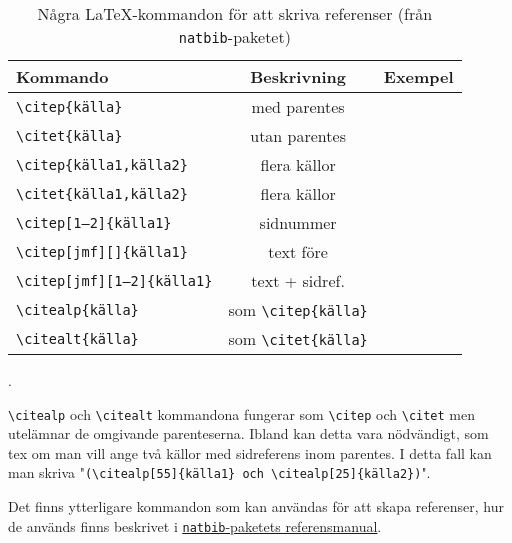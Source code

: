 \begin{table}[ht]
  \centering
  \renewcommand{\arraystretch}{1.25}%
  \begin{tabular}[t]{lcc}
    \toprule
    {\sffamily\textbf{Kommando}} &
    {\sffamily\textbf{Beskrivning}} &
    {\sffamily\textbf{Exempel}} \\
    \midrule
    \texttt{\textbackslash{}citep\{källa\}} &
    med parentes &
    \citep{bergman+wallin-2001} \\
    \texttt{\textbackslash{}citet\{källa\}} &
    utan parentes &
    \citet{bergman+wallin-2001} \\
    \midrule
    \texttt{\textbackslash{}citep\{källa1,källa2\}} &
    flera källor &
    \citep{bergman+wallin-2001,bergman-1977} \\
    \texttt{\textbackslash{}citet\{källa1,källa2\}} &
    flera källor &
    \citet{bergman+wallin-2001,bergman-1977} \\
    \midrule
    \texttt{\textbackslash{}citep[1--2]\{källa1\}} &
    sidnummer &
    \citep[1--2]{bergman-1977} \\
    \texttt{\textbackslash{}citep[jmf][]\{källa1\}} &
    text före &
    \citep[jmf][]{bergman-1977} \\
    \texttt{\textbackslash{}citep[jmf][1--2]\{källa1\}} &
    text + sidref. &
    \citep[jmf][1--2]{bergman-1977} \\
    \midrule
    \texttt{\textbackslash{}citealp\{källa\}} &
    som \texttt{\textbackslash{}citep\{källa\}} &
    \citealp{bergman+wallin-2001} \\
    \texttt{\textbackslash{}citealt\{källa\}} &
    som \texttt{\textbackslash{}citet\{källa\}} &
    \citealt{bergman+wallin-2001} \\
    \bottomrule
  \end{tabular}
  \caption{Några \LaTeX{}-kommandon för att skriva referenser (från
    \texttt{natbib}-paketet)}.
  \label{tab-cite-kommandon}
\end{table}

\texttt{\textbackslash{}citealp} och \texttt{\textbackslash{}citealt}
kommandona fungerar som \texttt{\textbackslash{}citep} och
\texttt{\textbackslash{}citet} men utelämnar de omgivande parenteserna. Ibland
kan detta vara nödvändigt, som tex om man vill ange två källor med sidreferens
inom parentes. I detta fall kan man skriva
"\texttt{(\textbackslash{}citealp[55]\{källa1\} och
  \textbackslash{}citealp[25]\{källa2\})}".

Det finns ytterligare kommandon som kan användas för att skapa referenser, hur
de används finns beskrivet i
\underline{\href{http://ftp.acc.umu.se/mirror/CTAN/macros/latex/contrib/natbib/natbib.pdf}{\texttt{natbib}-paketets referensmanual}}.

